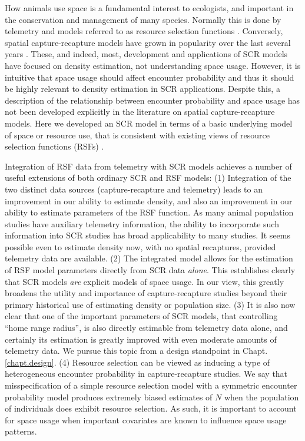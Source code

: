 How animals use space is a fundamental interest to ecologists, and
important in the conservation and management of many species.
Normally this is done by telemetry and models referred to as resource
selection functions \citep{manly_etal:2002}.  Conversely, spatial
capture-recapture models have grown in popularity over the last
several years \citep{efford:2004,borchers_efford:2008, royle:2008,
  efford_etal:2009ecol,royle_etal:2009ecol, gardner_etal:2010ecol,
  gardner_etal:2010jwm, kery_etal:2010,
  sollmann_etal:2011,mollet_etal:2012,gopalaswamy_etal:2012}. These,
and indeed, most, development and applications of SCR models have
focused on density estimation, not understanding space usage.
However, it is intuitive that space usage should affect encounter
probability and thus it should be highly relevant to density
estimation in SCR applications. Despite this, a description of the
relationship between encounter probability and space usage has not
been developed explicitly in the literature on spatial
capture-recapture models.  Here we developed an SCR model in terms of
a basic underlying model of space or resource use, that is consistent
with existing views of resource selection functions (RSFs)
\citep{manly_etal:2002}.

Integration of RSF data from telemetry with SCR models achieves a
number of useful extensions of both ordinary SCR and RSF models:
(1) Integration of the two distinct data sources (capture-recapture
and telemetry)
leads to an improvement in our
ability to estimate density, and also an improvement in our ability to
estimate parameters of the RSF function.  
As many animal population studies have auxiliary
telemetry information, the ability to incorporate such information
into SCR studies has broad applicability to 
many studies.  
It seems possible even to estimate density now, with no
spatial recaptures, provided telemetry data are available.
(2) The integrated model allows for the estimation of 
 RSF model parameters directly from SCR data {\it alone}.
This 
establishes clearly that SCR models {\it are} explicit models of space
usage. In our view,  
this  greatly broadens the
utility and importance of capture-recapture studies beyond their
primary historical use of estimating density or population size.
(3) It is also now
clear that one of the important parameters of SCR models, that
controlling ``home range radius'', is also directly estimable from
telemetry data alone, and certainly its estimation is greatly improved
with even moderate amounts of telemetry data. We pursue this topic
from a design standpoint in Chapt. \ref{chapt.design}.
(4) Resource selection can be viewed as inducing a type of
heterogeneous encounter probability in capture-recapture studies.
We say 
\citep{royle_etal:2012mee} 
that misspecification of a simple resource selection model with a 
 symmetric encounter probability model produces
extremely biased estimates of $N$ when the population of individuals
does exhibit resource selection.  As such, it is important to account
for space usage when important covariates are known to influence
space usage patterns.


